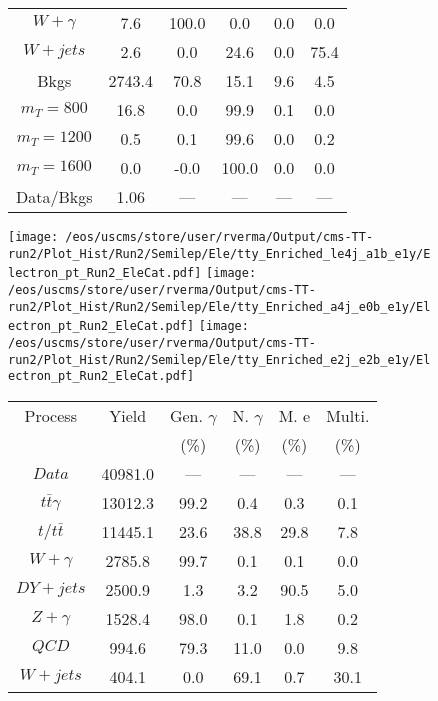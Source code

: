 \begin{figure}
\begin{minipage}[c]{0.32\textwidth}
{\begin{tabular}{cccccc}
$ W+\gamma $ &  7.6 &  100.0 &  0.0 &  0.0 &  0.0\\
$ W+jets $ &  2.6 &  0.0 &  24.6 &  0.0 &  75.4\\
Bkgs &  2743.4 &  70.8 &  15.1 &  9.6 &  4.5\\
$ m_{T} = 800 $ &  16.8 &  0.0 &  99.9 &  0.1 &  0.0\\
$ m_{T} = 1200 $ &  0.5 &  0.1 &  99.6 &  0.0 &  0.2\\
$ m_{T} = 1600 $ &  0.0 &  -0.0 &  100.0 &  0.0 &  0.0\\
Data/Bkgs &  1.06 &  --- &  --- &  --- &  ---\\
\hline
\end{tabular}
}
\end{minipage}
\end{figure}

\begin{figure}
\centering
\texttt{[image: /eos/uscms/store/user/rverma/Output/cms-TT-run2/Plot\_Hist/Run2/Semilep/Ele/tty\_Enriched\_le4j\_a1b\_e1y/Electron\_pt\_Run2\_EleCat.pdf]}
\texttt{[image: /eos/uscms/store/user/rverma/Output/cms-TT-run2/Plot\_Hist/Run2/Semilep/Ele/tty\_Enriched\_a4j\_e0b\_e1y/Electron\_pt\_Run2\_EleCat.pdf]}
\texttt{[image: /eos/uscms/store/user/rverma/Output/cms-TT-run2/Plot\_Hist/Run2/Semilep/Ele/tty\_Enriched\_e2j\_e2b\_e1y/Electron\_pt\_Run2\_EleCat.pdf]}
\begin{minipage}[c]{0.32\textwidth}
\centering
\tiny{
\begin{tabular}{cccccc}
\hline
Process & Yield & Gen. $\gamma$ & N. $\gamma$ & M. e & Multi. \\
 &  & (\%) & (\%) & (\%) & (\%)  \\
\hline
                                                                      $ Data $ &  40981.0 &  --- &  --- &  --- &  ---\\
$ t\bar{t}\gamma $ &  13012.3 &  99.2 &  0.4 &  0.3 &  0.1\\
$ t/t\bar{t} $ &  11445.1 &  23.6 &  38.8 &  29.8 &  7.8\\
$ W+\gamma $ &  2785.8 &  99.7 &  0.1 &  0.1 &  0.0\\
$ DY+jets $ &  2500.9 &  1.3 &  3.2 &  90.5 &  5.0\\
$ Z+\gamma $ &  1528.4 &  98.0 &  0.1 &  1.8 &  0.2\\
$ QCD $ &  994.6 &  79.3 &  11.0 &  0.0 &  9.8\\
$ W+jets $ &  404.1 &  0.0 &  69.1 &  0.7 &  30.1\\

\end{tabular}}
\end{minipage}
\end{figure}
